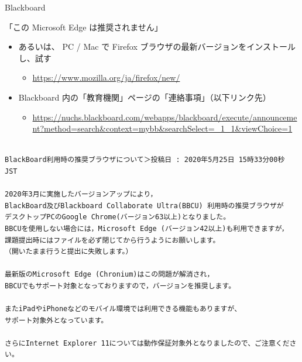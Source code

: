 \documentclass[a4j,10pt]{jsarticle}
\begin{document}
{\begin{frame}[label={sec:org166405d},fragile]{Blackboard}
\begin{block}{「この Microsoft Edge は推奨されません」}
\begin{itemize}
\begin{itemize}
\end{itemize}
\par
\item あるいは、 PC / Mac で Firefox ブラウザの最新バージョンをインストールし、試す
\begin{itemize}
\item \url{https://www.mozilla.org/ja/firefox/new/}
\end{itemize}
\par
\item Blackboard 内の「教育機関」ページの「連絡事項」（以下リンク先）
\begin{itemize}
\item \url{https://nuchs.blackboard.com/webapps/blackboard/execute/announcement?method=search\&context=mybb\&searchSelect=\_1\_1\&viewChoice=1}
\end{itemize}
\end{itemize}
\par
\begin{verbatim}

BlackBoard利用時の推奨ブラウザについて＞投稿日 : 2020年5月25日 15時33分00秒 JST

2020年3月に実施したバージョンアップにより，
BlackBoard及びBlackboard Collaborate Ultra(BBCU) 利用時の推奨ブラウザが
デスクトップPCのGoogle Chrome(バージョン63以上)となりました。
BBCUを使用しない場合には，Microsoft Edge (バージョン42以上)も利用できますが，
課題提出時にはファイルを必ず閉じてから行うようにお願いします。
（開いたまま行うと提出に失敗します。）

最新版のMicrosoft Edge (Chronium)はこの問題が解消され，
BBCUでもサポート対象となっておりますので，バージョンを推奨します。

またiPadやiPhoneなどのモバイル環境では利用できる機能もありますが、
サポート対象外となっています。

さらにInternet Explorer 11については動作保証対象外となりましたので、ご注意ください。\end{verbatim}


\end{block}
\end{frame}}
\end{document}
